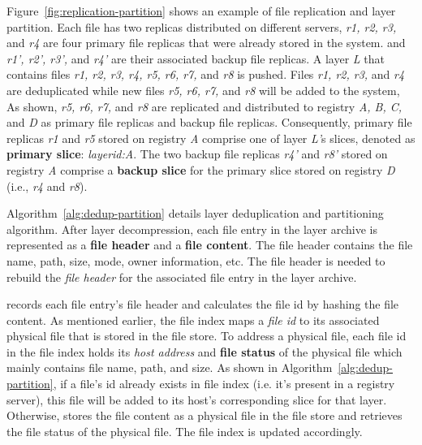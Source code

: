Figure~\ref{fig:replication-partition} shows an example of file replication and layer partition.
Each file has two replicas distributed on different servers,
\emph{r1, r2, r3,} and \emph{r4} are four primary file replicas that were already stored in the system.
and \emph{r1', r2', r3',} and \emph{r4'} are their associated backup file replicas. 
A layer \emph{L} that contains files \emph{r1, r2, r3, r4, r5, r6, r7,} and \emph{r8} is pushed.
Files \emph{r1, r2, r3,} and \emph{r4} are deduplicated
while new files
\emph{r5, r6, r7,} and \emph{r8} will be added to the system, 
As shown, \emph{r5, r6, r7,} and \emph{r8} are replicated and distributed to registry \emph{A, B, C,} and \emph{D} 
as primary file replicas and backup file replicas.
Consequently,
primary file replicas \emph{r1} and \emph{r5} stored on registry \emph{A} comprise one of layer \emph{L'}s slices, 
denoted as \textbf{primary slice}:
\emph{layerid:A}.
The two backup file replicas \emph{r4'} and \emph{r8'} stored on registry \emph{A} comprise a \textbf{backup slice} for the primary slice stored 
on registry \emph{D} (i.e., \emph{r4} and \emph{r8}).




Algorithm~\ref{alg:dedup-partition} details layer deduplication and partitioning algorithm.
After layer decompression, 
each file entry in the layer archive %
 is represented as a \textbf{file header} and a \textbf{file content}.
The file header contains the file name, path, size, mode, owner information, etc. %
The file header is needed to rebuild the \emph{file header} %
for 
the associated file entry in the layer archive.

\sysname records each file entry's file header and 
calculates the file id by hashing the file content.
As mentioned earlier, the file index maps a \emph{file id} to its associated physical file that is stored in the file store.
To address a physical file,
each file id in the file index holds its 
\emph{host address} and \textbf{file status} of the physical file which mainly contains file name, path, and size.
As shown in Algorithm~\ref{alg:dedup-partition}, 
if a file's id already exists in file index (i.e. it's present in a registry server), 
this file will be added to its host's corresponding slice for that layer. 
Otherwise,
\sysname stores the file content as a physical file in the file store
and retrieves the file status of the physical file.
The file index is updated accordingly.

